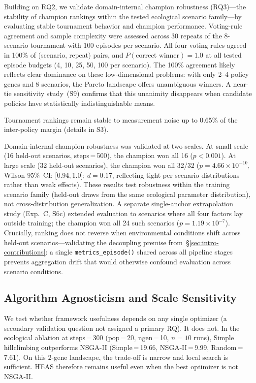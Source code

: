 \documentclass{wscpaperproc}
\begin{document}
Building on RQ2, we validate domain-internal champion robustness (RQ3)---the
stability of champion rankings within the tested ecological scenario family---by evaluating stable tournament behavior and champion performance. Voting-rule agreement and sample complexity
were assessed across 30 repeats of
the 8-scenario tournament with 100 episodes per scenario. All four voting rules
agreed in 100\% of
(scenario, repeat) pairs, and $P(\text{correct winner})\!=\!1.0$ at all tested
episode budgets (4, 10, 25, 50, 100 per scenario). The 100\% agreement likely
reflects clear dominance on these low-dimensional problems: with only 2--4 policy
genes and 8 scenarios, the Pareto landscape offers unambiguous winners. A
near-tie sensitivity study~(S9) confirms that this unanimity disappears when
candidate policies have statistically indistinguishable means.

Tournament rankings remain stable to measurement noise up to 0.65\% of the inter-policy margin (details in S3).

Domain-internal champion robustness was validated at two scales. At small
scale (16 held-out scenarios, steps\,=\,500), the champion won all 16
($p\!<\!0.001$). At large scale (32 held-out scenarios), the champion won
all 32/32 ($p\!=\!4.66\!\times\!10^{-10}$, Wilson 95\%~CI: [0.94,\,1.0];
$d\!=\!0.17$, reflecting tight per-scenario distributions rather than weak
effects). These results test robustness within the training scenario family
(held-out draws from the same ecological parameter distribution), not
cross-distribution generalization. A separate single-anchor extrapolation
study (Exp.~C, S6c) extended evaluation to scenarios where all four
factors lay outside training; the champion won all 24 such scenarios
($p\!=\!1.19\!\times\!10^{-7}$).
Crucially, ranking does not reverse when environmental conditions shift
across held-out scenarios---validating the decoupling premise
from~\S\ref{sec:intro-contributions}: a single \texttt{metrics\_episode()}
shared across all pipeline stages prevents aggregation drift that would
otherwise confound evaluation across scenario conditions.


\subsection{Algorithm Agnosticism and Scale Sensitivity}
\label{sec:scale}

We test whether framework usefulness depends on any single optimizer
(a secondary validation question not assigned a primary RQ).
It does not. In the ecological ablation at steps\,=\,300
(pop\,=\,20, ngen\,=\,10, $n\!=\!10$ runs), Simple hillclimbing outperforms
NSGA-II (Simple\,=\,19.66, NSGA-II\,=\,9.99, Random\,=\,7.61). On this
2-gene landscape, the trade-off is narrow and local search is sufficient. HEAS
therefore remains useful even when the best optimizer is not NSGA-II.
\end{document}
